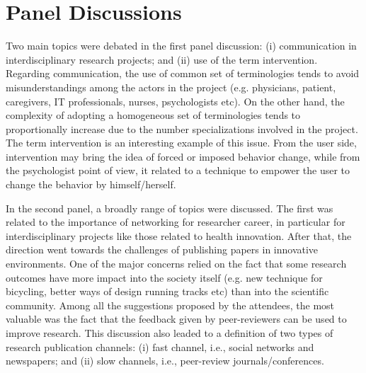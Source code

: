 \section*{Panel Discussions}

Two main topics were debated in the first panel discussion: (i) communication in interdisciplinary research projects; and (ii) use of the term intervention. 
Regarding communication, the use of common set of terminologies tends to avoid misunderstandings among the actors in the project (e.g. physicians, patient, caregivers, IT professionals, nurses, psychologists etc). 
On the other hand, the complexity of adopting a homogeneous set of terminologies tends to proportionally increase due to the number specializations involved in the project. 
The term intervention is an interesting example of this issue. 
From the user side, intervention may bring the idea of forced or imposed behavior change, while from the psychologist point of view, it related to a technique to empower the user to change the behavior by himself/herself.
 
In the second panel, a broadly range of topics were discussed. 
The first was related to the importance of networking for researcher career, in particular for interdisciplinary projects like those related to health innovation. 
After that, the direction went towards the challenges of publishing papers in innovative environments.
One of the major concerns relied on the fact that some research outcomes have more impact into the society itself (e.g. new technique for bicycling, better ways of design running tracks etc) than into the scientific community.
Among all the suggestions proposed by the attendees, the most valuable was the fact that the feedback given by peer-reviewers can be used to improve research. 
This discussion also leaded to a definition of two types of research publication channels: (i) fast channel, i.e., social networks and newspapers; and (ii) slow channels, i.e., peer-review journals/conferences.


